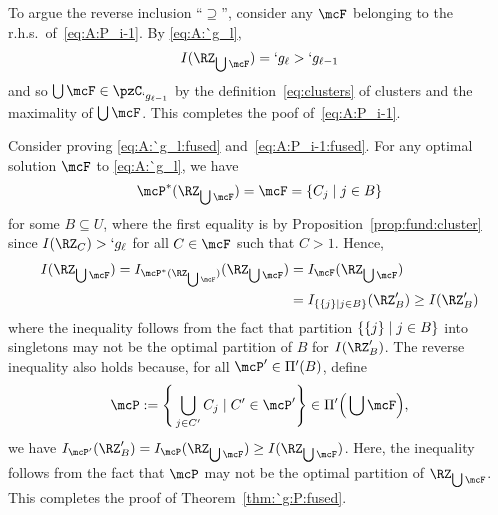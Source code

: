 \begin{Proof}
	To argue the reverse inclusion ``$\supseteq$'', consider any $\mcF$ belonging to the r.h.s.\
	of~\eqref{eq:A:P_i-1}. By \eqref{eq:A:`g_l}, 
	\begin{align*}
		I(\RZ_{\bigcup \mcF})=`g_\ell>`g_{\ell-1}
	\end{align*}
	and so $\bigcup \mcF\in \pzC_{`g_{\ell-1}}$ by the definition~\eqref{eq:clusters} of clusters and
	the maximality of $\bigcup \mcF$. This completes the poof of~\eqref{eq:A:P_i-1}.
	
	Consider proving \eqref{eq:A:`g_l:fused}
	and~\eqref{eq:A:P_i-1:fused}.
	For any optimal solution $\mcF$ to \eqref{eq:A:`g_l},  we have
	\begin{align*}
		\mcP^*(\RZ_{\bigcup \mcF})=\mcF=\Set{C_j\mid j\in B}
	\end{align*}
	for some $B\subseteq U$, 
	where the first equality is by Proposition~\ref{prop:fund:cluster}
	since $I(\RZ_C)>`g_\ell$ for all $C\in \mcF$ such that ${C}>1$. Hence,
	\begin{align*}
		I(\RZ_{\bigcup \mcF})=I_{\mcP^*(\RZ_{\bigcup \mcF})}(\RZ_{\bigcup \mcF})&=I_{\mcF}(\RZ_{\bigcup \mcF})\\&=I_{\Set{\Set{j}\mid j\in B}}(\RZ'_B)\geq I(\RZ'_B)
	\end{align*}
	where the inequality follows from the fact that partition $\{\{j\}\mid j\in B\}$ into
	singletons  may not be the optimal partition of $B$ for $I(\RZ'_B)$. The reverse inequality also
	holds because, for all $\mcP'\in \Pi'(B)$, define 
	\begin{align*}
		\mcP:=\Bigg\{\bigcup_{j\in C'}C_j\mid C'\in\mcP' \Bigg\}\in \Pi'\Big(\bigcup\mcF\Big),
	\end{align*}
	we have $I_{\mcP'}(\RZ'_B)=I_{\mcP}(\RZ_{\bigcup\mcF})\geq I(\RZ_{\bigcup \mcF})$. Here, the
	inequality follows from the fact that $\mcP$ may not be the optimal partition of
	$\RZ_{\bigcup\mcF}$.  This completes the proof of Theorem~\ref{thm:`g:P:fused}.
\end{Proof} 


